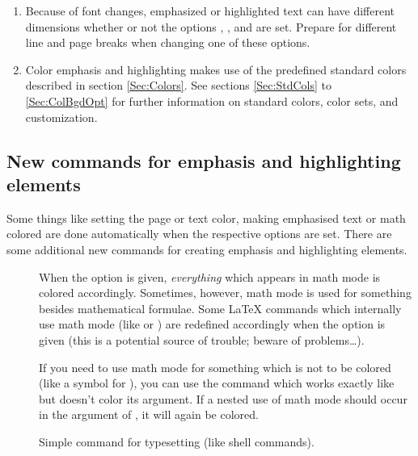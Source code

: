\begin{slide}
\begin{enumerate}
    \newslide

  \item Because of font changes, emphasized or highlighted text can have different dimensions whether or not the options
    , , and  are set. Prepare for different line and page breaks
    when changing one of these options.

  \item Color emphasis and highlighting makes use of the predefined standard colors described in section
    \ref{Sec:Colors}. See sections \ref{Sec:StdCols} to \ref{Sec:ColBgdOpt} for further information on standard colors,
    color sets, and customization.
  \end{enumerate}

  \newslide

  \subsection{New commands for emphasis and highlighting elements}\label{Sec:Colorcommands}
  Some things like setting the page or text color, making emphasised text or math colored are done automatically when
  the respective options are set. There are some additional new commands for creating emphasis and highlighting
  elements.

  \begin{description}
  \item[]
    When the  option is given, \emph{everything} which appears in
    math mode is colored accordingly. Sometimes, however, math mode is used for something besides mathematical formulae.
    Some \LaTeX{} commands which internally use math mode (like  or ) are
    redefined accordingly when the  option is given (this is a potential source of trouble; beware of
    problems\dots).

    If you need to use math mode for something which is not to be colored (like a symbol for ), you can
    use the  command which works exactly like  but doesn't color its argument.
    If a nested use of math mode should occur in the argument of , it will again be colored.
  \end{description}

  \newslide

  \begin{description}
  \item[]
    Simple command for typesetting  (like shell commands).


\end{description}
\end{slide}
